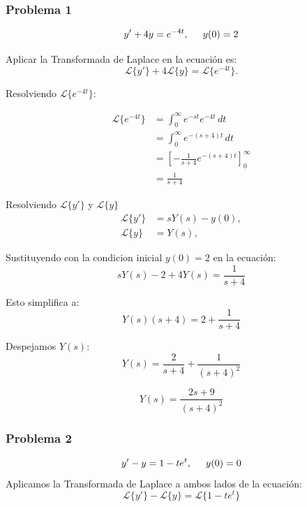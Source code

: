 \documentclass{article}
\begin{document}
\subsubsection{Problema 1}
\[y' + 4y = e^{-4t}, \hspace{.5cm} y(0) = 2\]

Aplicar la Transformada de Laplace en la ecuación es:
\begin{equation*}
    \mathcal{L}\{y'\} + 4\mathcal{L}\{y\} = \mathcal{L}\{e^{-4t}\}.
\end{equation*}

Resolviendo $\mathcal{L}\{e^{-4t}\}$:

\begin{align*}
    \mathcal{L}\{e^{-4t}\} & = \int_0^\infty e^{-st}e^{-4t}\,dt                  \\
                           & = \int_0^\infty e^{-(s+4)t}\,dt                     \\
                           & = \left[ -\frac{1}{s+4}e^{-(s+4)t} \right]_0^\infty \\
                           & = \frac{1}{s + 4}
\end{align*}

Resolviendo $\mathcal{L}\{y'\}$ y $\mathcal{L}\{y\}$
\begin{align*}
    \mathcal{L}\{y'\} & = sY(s) - y(0), \\
    \mathcal{L}\{y\}  & = Y(s),
\end{align*}

Sustituyendo con la condicion inicial \(y(0) = 2\) en la ecuación:
\begin{equation*}
    sY(s) - 2 + 4Y(s) = \frac{1}{s + 4}
\end{equation*}

Esto simplifica a:
\begin{equation*}
    Y(s)(s + 4) = 2 + \frac{1}{s + 4}
\end{equation*}

Despejamos \(Y(s)\):
\begin{equation*}
    Y(s) = \frac{2}{s + 4} + \frac{1}{(s + 4)^2}
\end{equation*}

\[
    Y(s) = \frac{2s+9}{(s + 4)^2}
\]

\newpage

\subsubsection{Problema 2}
\[y' - y = 1 - te^{t}, \hspace{.5cm} y(0) = 0\]
Aplicamos la Transformada de Laplace a ambos lados de la ecuación:
\[\mathcal{L}\{y'\} - \mathcal{L}\{y\} = \mathcal{L}\{1 - te^{t}\}\]
\end{document}
